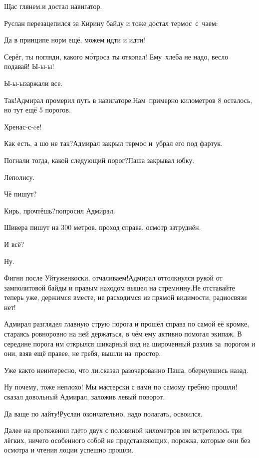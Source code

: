 \diagdash Щас глянем.\mdash и достал навигатор.

Руслан перезацепился за Кирину байду и тоже достал термос~с~чаем:

\diagdash Да в принципе норм ещё, можем идти и идти!

\diagdash Серёг, ты погляди, какого м\'{о}троса ты откопал! Ему~хлеба не надо, весло подавай! Ы-ы-ы!

\diagdash Ы-ы-ы\mdash заржали все.

\diagdash Так!\mdash Адмирал промерил путь в навигаторе.\mdash Нам~примерно километров 8 осталось, но тут ещё 5 порогов.

\diagdash Хренас-с-cе!

\diagdash Как есть, а шо не так?\mdash Адмирал закрыл термос и~убрал его под фартук.

\diagdash Погнали тогда, какой следующий порог?\mdash Паша закрывал юбку.

\diagdash Леполису.

\diagdash Чё пишут?

\diagdash Кирь, прочтёшь?\mdash попросил Адмирал.

\diagdash Шивера пишут на 300 метров, проход справа, осмотр затруднён.

\diagdash И всё?

\diagdash Ну.

\diagdash Фигня после Уйтуженкоски, отчаливаем!\mdash Адмирал оттолкнулся рукой от замполитовой байды и правым находом вышел на стремнину.\mdash Не отставайте теперь уже, держимся вместе, не расходимся из прямой видимости, радиосвязи нет!

Адмирал разглядел главную струю порога и прошёл справа по самой её кромке, стараясь ровно\sdash ровно на ней держаться, в чём ему активно помогал экипаж. В середине порога им открылся шикарный вид на широченный разлив за~порогом и они, взяв ещё правее, не гребя, вышли на~простор.

\diagdash Уже как\sdash то неинтересно, что ли.\mdash сказал разочарованно Паша, обернувшись назад.

\diagdash Ну почему, тоже неплохо! Мы мастерски с вами по самому гребню прошли!\mdash сказал довольный Адмирал, заложив левый поворот.

\diagdash Да ваще по лайту!\mdash Руслан окончательно, надо полагать, освоился.

Далее на протяжении где\sdash то двух с половиной километров им встретилось три лёгких, ничего особенного собой не представляющих, порожка, которые они без осмотра и чтения лоции успешно прошли.

